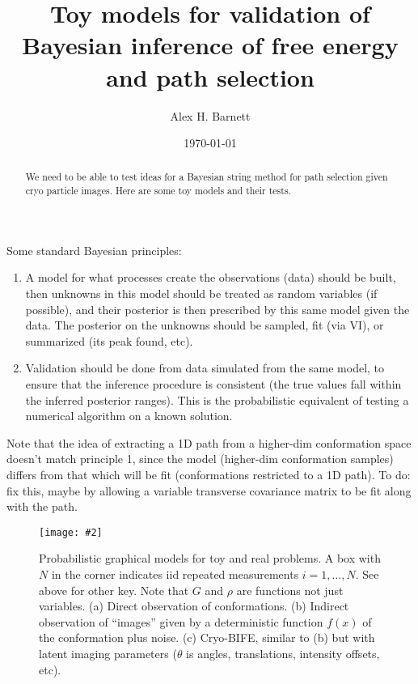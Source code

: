 \documentclass[10pt]{article}
\newcommand{\ben}{\begin{enumerate}}
\newcommand{\een}{\end{enumerate}}
\newcommand{\bfi}{\begin{figure}}
\newcommand{\efi}{\end{figure}}
\newcommand{\ca}[2]{\caption{#1 \label{#2}}}
\newcommand{\ig}[2]{\texttt{[image: \#2]}}
\begin{document}
\title{Toy models for validation of Bayesian inference of free energy and path selection}

\author{Alex H. Barnett}
\date{\today}
\maketitle

\begin{abstract}
  We need to be able to test ideas for a Bayesian string method for path selection given cryo particle images.
  Here are some toy models and their tests.
\end{abstract}

Some standard Bayesian principles:
\ben
\item
A model for what processes create the observations (data)
should be built, then unknowns in this model should be treated as
random variables (if possible), and their posterior is then
prescribed by this same model given the data. The posterior on the unknowns
should be sampled, fit (via VI), or summarized (its peak found, etc).
\item
Validation should be done from data simulated from the same model,
to ensure that the inference procedure is consistent (the true values
fall within the inferred posterior ranges). This is the
probabilistic
equivalent of testing a numerical algorithm on a known solution.
\een

Note that the idea of extracting a 1D path from a higher-dim conformation
space
doesn't match principle 1, since the model (higher-dim conformation samples)
differs from that which will be fit (conformations restricted to a 1D path).
To do: fix this, maybe by allowing a variable transverse covariance matrix to
be fit along with the path.





\bfi[t]
\ig{width=6in}{graphs}
\ca{Probabilistic graphical models for toy and real problems.
  A box with $N$ in the corner indicates iid repeated measurements
  $i=1,\dots,N$. See above for other key.
  Note that $G$ and $\rho$ are functions not just variables.
  (a) Direct observation of conformations. (b) Indirect observation
  of ``images'' given by a deterministic function $f(x)$ of the conformation
  plus noise. (c) Cryo-BIFE, similar to (b) but with latent imaging parameters
  ($\theta$ is angles, translations, intensity offsets, etc).
  }{f:graphs}
\efi
\end{document}
